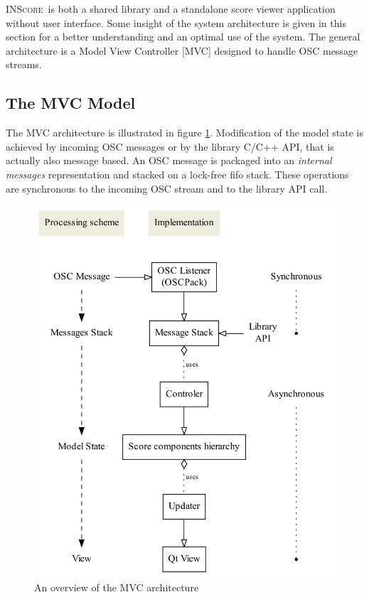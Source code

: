\documentclass[11pt,letterpaper]{article}
\newcommand{\inscore}		{\textsc{\small INScore}}
\begin{document}
\inscore\ is both a shared library and a standalone score viewer application without user interface. Some insight of the system architecture is given in this section for a better understanding and an optimal use of the system. The general architecture is a Model View Controller [MVC] designed to handle OSC message streams. 

\subsection{The MVC Model}

The MVC architecture is illustrated in figure \ref{mvc}. Modification of the model state is achieved by incoming OSC messages or by the library C/C++ API, that is actually also message based. An OSC message is packaged into an \emph{internal messages} representation and stacked on a lock-free fifo stack. These operations are synchronous to the incoming OSC stream and to the library API call. 

\begin{figure}[h]
	\centering \includegraphics[width=0.98\columnwidth]{rsrc/mvc}
 \caption{An overview of the MVC architecture}
 \label{mvc}
\end{figure}
\end{document}
